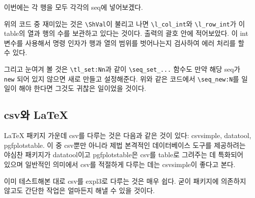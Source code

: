 이번에는 각 행을 모두 각각의 seq에 넣어보겠다.


위의 코드 중 재미있는 것은 \verb|\ShVal|이 불리고 나면 \verb|\l_col_int|와 
\verb|\l_row_int|가 이 table의 열과 행의 수를 보관하고 있다는 것이다. 
출력의 괄호 안에 적어보았다. 이 int 변수를 사용해서 명령 인자가 행과 열의 범위를
벗어나는지 검사하여 에러 처리를 할 수 있다.

그리고 눈여겨 볼 것은 \verb|\tl_set:Nn|과 같이 \verb|\seq_set_...| 함수도
만약 해당 seq가 \verb|new| 되어 있지 않으면 새로 만들고 설정해준다.
위와 같은 코드에서 \verb|\seq_new:N|를 일일이 해야 한다면 그것도 귀찮은 일이었을 것이다.


\subsection{csv와 \LaTeX}

\LaTeX{} 패키지 가운데 csv를 다루는 것은 다음과 같은 것이 있다: \textsf{csvsimple}, 
\textsf{datatool}, \textsf{pgfplotstable}.
이 중 csv뿐만 아니라 제법 본격적인 데이터베이스 도구를 제공하려는 야심찬 패키지가 \textsf{datatool}이고
\textsf{pgfplotstable}은 csv를 table로 그려주는 데 특화되어 있으며 일반적인 의미에서
csv를 적절하게 다루는 데는 \textsf{csvsimple}이 좋다고 본다.

이미 테스트해본 대로 csv를 expl3로 다루는 것은 매우 쉽다. 굳이 패키지에 의존하지 않고도
간단한 작업은 얼마든지 해낼 수 있을 것이다.

